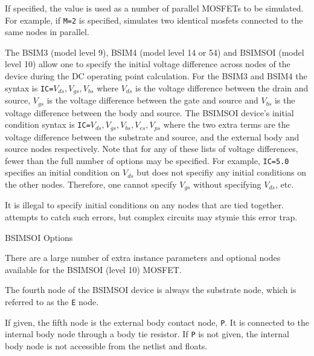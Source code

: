 \begin{Device}
\begin{Parameters}

If specified, the value is used as a number of parallel MOSFETs to be
simulated.  For example, if \texttt{M=2} is specified, \Xyce{} simulates two
identical mosfets connected to the same nodes in parallel.


The BSIM3 (model level 9), BSIM4 (model level 14 or 54) and BSIMSOI (model
level 10) allow one to specify the initial voltage difference across
nodes of the device during the DC operating point calculation.  For the
BSIM3 and BSIM4 the syntax is \texttt{IC=$V_{ds}, V_{gs}, V_{bs}$}
where $V_{ds}$ is the voltage difference between the drain and source,
$V_{gs}$ is the voltage difference between the gate and source and
$V_{bs}$ is the voltage difference between the body and source.  The
BSIMSOI device's initial condition syntax is \texttt{IC=$V_{ds},
  V_{gs}, V_{bs}, V_{es}, V_{ps}$} where the two extra terms are the
voltage difference between the substrate and source, and the external
body and source nodes respectively.  Note that for any of these lists of
voltage differences, fewer than the full number of options may be
specified.  For example, \texttt{IC=5.0} specifies an initial condition on $V_{ds}$
but does not specifiy any initial conditions on the other nodes.
Therefore, one cannot specify $V_{gs}$ without specifying $V_{ds}$, etc.

It is illegal to specify initial conditions on any nodes that are tied
together.  \Xyce{} attempts to catch such errors, but complex circuits may
stymie this error trap.

\end{Parameters}

\vbox{\hrulefill}
\item[BSIMSOI Options]

There are a large number of extra instance parameters and optional
nodes available for the BSIMSOI (level 10) MOSFET.

\begin{Parameters}


The fourth node of the BSIMSOI device is always the substrate node,
which is referred to as the \texttt{E} node. 


If given, the fifth node is the external body contact node,
\texttt{P}.  It is connected to the internal body node through a body
tie resistor.  If \texttt{P} is not given, the internal body node is
not accessible from the netlist and floats.


\end{Parameters}
\end{Device}
